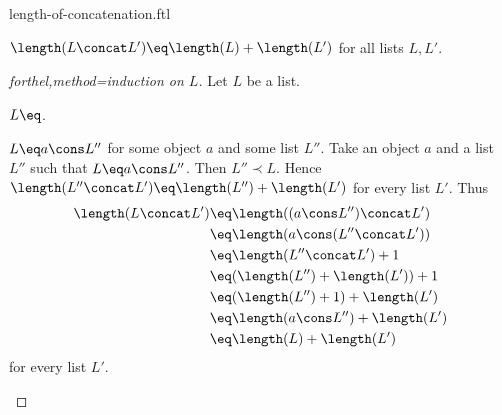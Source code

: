 \documentclass{naproche-library}
\begin{document}
\begin{smodule}[title=Length of Concatenation]{length-of-concatenation.ftl}

\begin{proposition}[forthel,id=LISTS_LENGTHCONCAT_4512036658964875]
  $\length(L \concat L') \eq \length(L) + \length(L')$ for all lists $L, L'$.
\end{proposition}
\begin{proof}[forthel,method=induction on $L$]
  Let $L$ be a list.

  \begin{case}{$L \eq \list{}$.}\end{case}

  \begin{case}{$L \eq a \cons L''$ for some object $a$ and some list $L''$.}
    Take an object $a$ and a list $L''$ such that $L \eq a \cons L''$.
    Then $L'' \prec L$.
    Hence $\length(L'' \concat L') \eq \length(L'') + \length(L')$ for every list $L'$.
    Thus
    \begin{align*}
      \length(L \concat L')
        &\eq \length((a \cons L'') \concat L')\\
        &\eq \length(a \cons (L'' \concat L'))\\
        &\eq \length(L'' \concat L') + 1\\
        &\eq (\length(L'') + \length(L')) + 1\\
        &\eq (\length(L'') + 1) + \length(L')\\
        &\eq \length(a \cons L'') + \length(L')\\
        &\eq \length(L) + \length(L')
    \end{align*}
    for every list $L'$.
  \end{case}
\end{proof}
\end{smodule}
\end{document}
